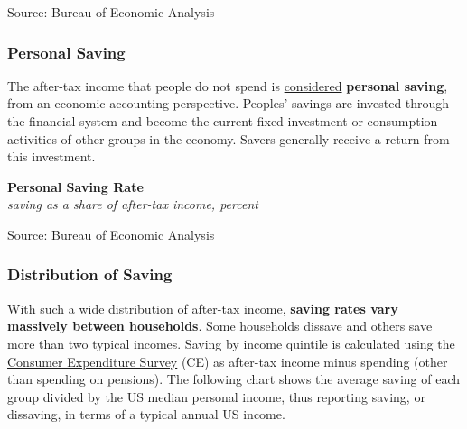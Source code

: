 \documentclass{report}
\makeatletter
\newcommand{\tbllink}[1]{\href{https://raw.githubusercontent.com/bdecon/US-chartbook/master/chartbook/data/#1}{\faTable}}
\newcommand*\short[1]{\expandafter\@gobbletwo\number\numexpr#1\relax}
\newcommand{\dateaxisticks}{
		date coordinates in=x, axis line style={draw=none},
		xmax={2023-02-15},
		max space between ticks=40,	    
		xtick={{1990-01-01}, {1992-01-01}, {1994-01-01}, 
			{1996-01-01}, {1998-01-01}, {2000-01-01}, 
			{2002-01-01}, {2004-01-01}, {2006-01-01},
			{2008-01-01}, {2010-01-01}, {2012-01-01}, {2014-01-01},
		    {2016-01-01}, {2018-01-01}, {2020-01-01}, {2022-01-01}, 
		    {2024-01-01}, {2026-01-01}},
		minor xtick={{1989-01-01}, {1991-01-01}, {1993-01-01},
			{1995-01-01}, {1997-01-01}, {1999-01-01}, 
			{2001-01-01}, {2003-01-01}, {2005-01-01}, {2007-01-01},
		    {2009-01-01}, {2011-01-01}, {2013-01-01}, {2015-01-01},
		    {2017-01-01}, {2019-01-01}, {2021-01-01}, {2023-01-01}, 
		    {2025-01-01}, {2027-01-01}},
		enlarge y limits={0.06}, enlarge x limits={0.01},
		}
\newcommand{\bbar}[2]{extra #1 ticks = {{#2}}, extra #1 tick labels = ,
		extra #1 tick style = {grid=major, grid style={thick, black!25}},}
\newcommand{\stdline}[4]{\addplot[very thick, no markers, color=#1] 
		table [x=#2, y=#3, col sep=comma] {#4};	}
\newcommand{\rbars}{
		\fill[color=black!10] (axis cs:{1990-07-01},\pgfkeysvalueof{/pgfplots/ymin}) rectangle 
			(axis cs:{1991-03-01}, \pgfkeysvalueof{/pgfplots/ymax});
		\fill[color=black!10] (axis cs:{2007-12-01},\pgfkeysvalueof{/pgfplots/ymin}) rectangle 
			(axis cs:{2009-07-01}, \pgfkeysvalueof{/pgfplots/ymax});
		\fill[color=black!10] (axis cs:{2001-03-01},\pgfkeysvalueof{/pgfplots/ymin}) rectangle 
			(axis cs:{2001-11-01}, \pgfkeysvalueof{/pgfplots/ymax});
		\fill[color=black!10] (axis cs:{2020-02-01},\pgfkeysvalueof{/pgfplots/ymin}) rectangle 
			(axis cs:{2020-05-01}, \pgfkeysvalueof{/pgfplots/ymax});}
\makeatother
\begin{document}
{\begin{minipage}{0.76\textwidth}
\footnotesize{Source: Bureau of Economic Analysis} \hfill \tbllink{pcedecomp.csv}
\end{minipage}
\newpage
\begin{minipage}{0.76\textwidth}
\subsubsection*{Personal Saving}
\small The after-tax income that people do not spend is \href{https://www.bea.gov/index.php/help/glossary/personal-saving}{considered} \textbf{personal saving}, from an economic accounting perspective. Peoples' savings are invested through the financial system and become the current fixed investment or consumption activities of other groups in the economy. Savers generally receive a return from this investment.


\vspace{1mm}

\normalsize \textbf{Personal Saving Rate}\\
\footnotesize{\textit{saving as a share of after-tax income, percent}}
\vspace{3.4cm}

\hspace{4mm} 

\footnotesize{Source: Bureau of Economic Analysis} \hfill \tbllink{psavert.csv}
\vspace{1mm}

\subsubsection*{Distribution of Saving}
\small With such a wide distribution of after-tax income, \textbf{saving rates vary massively between households}. Some households dissave and others save more than two typical incomes. Saving by income quintile is calculated using the \href{https://www.bls.gov/cex/}{Consumer Expenditure Survey} (CE) as after-tax income minus spending (other than spending on pensions). The following chart shows the average saving of each group divided by the US median personal income, thus reporting saving, or dissaving, in terms of a typical annual US income. 
\vspace{1mm}


\end{minipage}}
\end{document}
